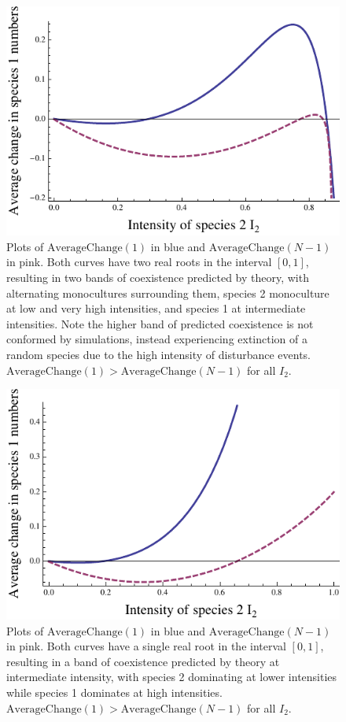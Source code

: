 \documentclass[preprint,10pt,reqno]{amsart}
\begin{document}
\begin{figure}[htbp]
\includegraphics[width=4.5in]{fourbits}
\caption{Plots of $\text{AverageChange}(1)$ in blue and $\text{AverageChange}(N-1)$ in pink. Both curves have two real roots in the interval $[0,1]$, resulting in two bands of coexistence predicted by theory, with alternating monocultures surrounding them, species 2 monoculture at low and very high intensities, and species 1 at intermediate intensities. Note the higher band of predicted coexistence is not conformed by simulations, instead experiencing extinction of a random species due to the high intensity of disturbance events. $\text{AverageChange}(1)>\text{AverageChange}(N-1)$ for all $I_2$.}
\label{fourbits}
\end{figure}
\begin{figure}[h]
\includegraphics[width=4.5in]{onerooteach}
\caption{Plots of $\text{AverageChange}(1)$ in blue and $\text{AverageChange}(N-1)$ in pink. Both curves have a single real root in the interval $[0,1]$, resulting in a band of coexistence predicted by theory at intermediate intensity, with species 2 dominating at lower intensities while species 1 dominates at high intensities. $\text{AverageChange}(1)>\text{AverageChange}(N-1)$ for all $I_2$.}
\label{onerooteach}
\end{figure}
\end{document}
